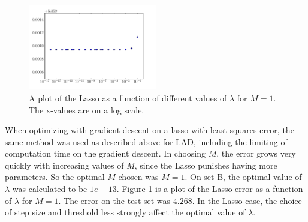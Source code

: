 \documentclass[10pt]{article}
\begin{document}
\begin{figure}[!ht]
	\centering
	\includegraphics[width=0.5\textwidth]{exercise4-2.pdf}
	\caption{A plot of the Lasso as a function of different values of $\lambda$ for $M = 1$. The x-values are on a log scale.}
	\label{fig:4-2}
\end{figure}

When optimizing with gradient descent on a lasso with least-squares error, the same method was used as described above for LAD, including the limiting of computation time on the gradient descent. In choosing $M$, the error grows very quickly with increasing values of $M$, since the Lasso punishes having more parameters. So the optimal $M$ chosen was $M = 1$. On set B, the optimal value of $\lambda$ was calculated to be $1e-13$. Figure \ref{fig:4-2} is a plot of the Lasso error as a function of $\lambda$ for $M = 1$. The error on the test set was $4.268$. In the Lasso case, the choice of step size and threshold less strongly affect the optimal value of $\lambda$. 
\end{document}
